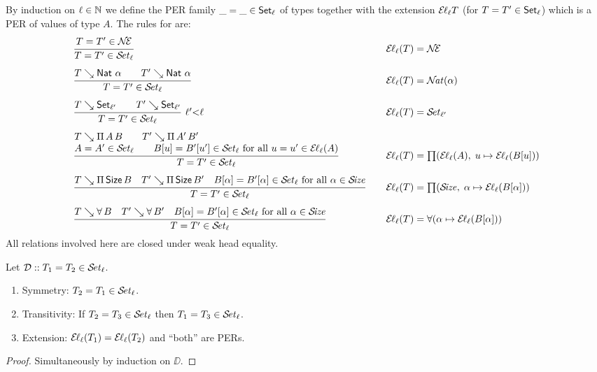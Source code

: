 \documentclass[acmlarge,review,anonymous]{acmart}\settopmatter{printfolios=true}
\begin{document}
By induction on $\ell \in \NN$ we define the PER family
$\_ = \_ \in \Set[\ell]$ of types
together with the extension $\EL[\ell] T$ (for $T = T' \in \Set[\ell]$)
which is a PER of values of type $A$.
The rules for  are:
\[
\begin{array}{l@{\qquad}l}
  \ru{%
      T = T' \in \NEE
    }{T = T' \in \SET[\ell]}
  & \EL[\ell](T) = \NEE
\\[3ex]
  \ru{T \evalsto \Nat\,\alpha \qquad T' \evalsto \Nat\,\alpha
    }{T = T' \in \SET[\ell]}
  & \EL[\ell](T) = \NAT(\alpha)
\\[3ex]
  \rux{T \evalsto \Set[\ell'] \qquad T' \evalsto \Set[\ell']
     }{T = T' \in \SET[\ell]
     }{\ell'{<}\ell}
  & \EL[\ell](T) = \SET[\ell']
\\[3ex]
  \rul{T \evalsto \piT A B \qquad
      T' \evalsto \piT{A'}{B'} \\
      A = A' \in \SET[\ell] \qquad
      B[u] = B'[u'] \in \SET[\ell] \mforall u = u' \in \EL[\ell](A)
    }{T = T' \in \SET[\ell]}
  & \EL[\ell](T) = \PI(\EL[\ell](A),\;u \mapsto \EL[\ell](B[u]))
\\[3ex]
  \rul{T \evalsto \piT \Size B \quad
      T' \evalsto \piT{\Size}{B'} \quad
      B[\alpha] = B'[\alpha] \in \SET[\ell] \mforall \alpha \in \SIZE
    }{T = T' \in \SET[\ell]}
  & \EL[\ell](T) = \PI(\SIZE,\; \alpha \mapsto \EL[\ell](B[\alpha]))
\\[3ex]
  \rul{T \evalsto \forallT B \quad
      T' \evalsto \forallT{B'} \quad
      B[\alpha] = B'[\alpha] \in \SET[\ell] \mforall \alpha \in \SIZE
    }{T = T' \in \SET[\ell]}
  & \EL[\ell](T) = \FORALL(\alpha \mapsto \EL[\ell](B[\alpha]))
\end{array}
\]
All relations involved here are closed under weak head equality.
\begin{lemma}
  Let $\DD :: T_1 = T_2 \in \SET[\ell]$.
  \begin{enumerate}
  \item Symmetry: $T_2 = T_1 \in \SET[\ell]$.
  \item Transitivity: If\/ $T_2 = T_3 \in \SET[\ell]$ then $T_1 = T_3 \in \SET[\ell]$.
  \item Extension: $\EL[\ell](T_1) = \EL[\ell](T_2)$ and ``both'' are PERs.
  \end{enumerate}
\end{lemma}
\begin{proof}
  Simultaneously by induction on $\DD$.
\end{proof}
\end{document}

